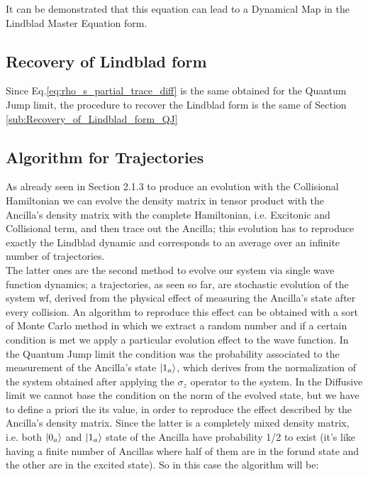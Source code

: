 \documentclass[a4paper,12pt]{article}
\begin{document}
	\begin{flushleft}
		It can be demonstrated that this equation can lead to a Dynamical Map in the Lindblad Master Equation form.
	\end{flushleft}

	\subsection{Recovery of Lindblad form}
	\label{sub:Recovery_of_Lindblad_form_Diff}

	Since Eq.\eqref{eq:rho_s_partial_trace_diff} is the same obtained for the Quantum Jump limit, the procedure to recover the Lindblad form is the same of Section \ref{sub:Recovery_of_Lindblad_form_QJ}

	\subsection{Algorithm for Trajectories}
	\label{sub:alg_for_traj_diff}

	As already seen in Section 2.1.3 to produce an evolution with the Collisional Hamiltonian we can evolve the density matrix in tensor product with the Ancilla's density matrix with the complete Hamiltonian, i.e. Excitonic and Collisional term, and then trace out the Ancilla; this evolution has to reproduce exactly the Lindblad dynamic and corresponds to an average over an infinite number of trajectories. \\
	The latter ones are the second method to evolve our system via single wave function dynamics; a trajectories, as seen so far, are stochastic evolution of the system wf, derived from the physical effect of measuring the Ancilla's state after every collision. An algorithm to reproduce this effect can be obtained with a sort of Monte Carlo method in which we extract a random number and if a certain condition is met we apply a particular evolution effect to the wave function. In the Quantum Jump limit the condition was the probability associated to the measurement of the Ancilla's state $ \ket{1_a} $, which derives from the normalization of the system obtained after applying the $ \sigma_z $ operator to the system. In the Diffusive limit we cannot base the condition on the norm of the evolved state, but we have to define a priori the its value, in order to reproduce the effect described by the Ancilla's density matrix. Since the latter is a completely mixed density matrix, i.e. both $ \ket{0_a} $ and $ \ket{1_a} $ state of the Ancilla have probability 1/2 to exist (it's like having a finite number of Ancillas where half of them are in the forund state and the other are in the excited state). So in this case the algorithm will be:
\end{document}
